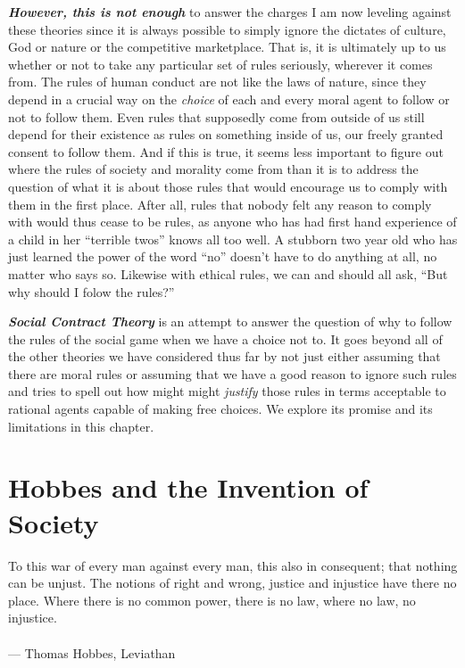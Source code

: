 \documentclass[12pt, openany]{book}
\newenvironment{epigraph}%
{
\begin{flushright}
\begin{minipage}{30em}
\begin{flushright}
\itshape
}%
{
\end{flushright}
\end{minipage}
\end{flushright}
\vspace{1em}
}
\begin{document}
\textbf{\emph{However, this is not enough}} to answer the charges I am now leveling against these theories since it is always possible to simply ignore the dictates of culture, God or nature or the competitive marketplace. That is, it is ultimately up to us whether or not to take any particular set of rules seriously, wherever it comes from. The rules of human conduct are not like the laws of nature, since they depend in a crucial way on the \emph{choice} of each and every moral agent to follow or not to follow them. Even rules that supposedly come from outside of us still depend for their existence as rules on something inside of us, our freely granted consent to follow them. And if this is true, it seems less important to figure out where the rules of society and morality come from than it is to address the question of what it is about those rules that would encourage us to comply with them in the first place. After all, rules that nobody felt any reason to comply with would thus cease to be rules, as anyone who has had first hand experience of a child in her ``terrible twos'' knows all too well. A stubborn two year old who has just learned the power of the word ``no'' doesn't have to do anything at all, no matter who says so. Likewise with ethical rules, we can and should all ask, ``But why should I folow the rules?''

\textbf{\emph{Social Contract Theory}} is an attempt to answer the question of why to follow the rules of the social game when we have a choice not to. It goes beyond all of the other theories we have considered thus far by not just either assuming that there are moral rules or assuming that we have a good reason to ignore such rules and tries to spell out how might might \emph{justify} those rules in terms acceptable to rational agents capable of making free choices. We explore its promise and its limitations in this chapter.

\hypertarget{hobbes-and-the-invention-of-society}{%
\section{Hobbes and the Invention of Society}\label{hobbes-and-the-invention-of-society}}

\begin{epigraph}

To this war of every man against every man, this also in consequent; that nothing can be unjust. The notions of right and wrong, justice and injustice have there no place. Where there is no common power, there is no law, where no law, no injustice.\\
~\\
--- Thomas Hobbes, Leviathan

\end{epigraph}
\end{document}
